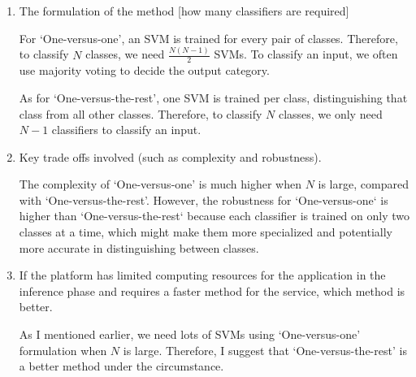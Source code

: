 \documentclass[twocolumn]{extarticle}
\begin{document}
\begin{enumerate}
	\begin{enumerate}[label=\alph*.]
	\item The formulation of the method [how many classifiers are required]
	
	For `One-versus-one', an SVM is trained for every pair of classes. Therefore, to classify $N$ classes, we need $\frac{N(N-1)}{2}$ SVMs. To classify an input, we often use majority voting to decide the output category. 
	
	As for `One-versus-the-rest', one SVM is trained per class, distinguishing that class from all other classes. Therefore, to classify $N$ classes, we only need $N-1$ classifiers to classify an input. 
	

	\item Key trade offs involved (such as complexity and robustness).
	
	The complexity of `One-versus-one' is much higher when $N$ is large, compared with `One-versus-the-rest'. However, the robustness for `One-versus-one` is higher than `One-versus-the-rest` because each classifier is trained on only two classes at a time, which might make them more specialized and potentially more accurate in distinguishing between classes.
	
	\item If the platform has limited computing resources for the application in the inference phase and requires a faster method for the service, which method is better.
	
	As I mentioned earlier, we need lots of SVMs using `One-versus-one' formulation when $N$ is large. Therefore, I suggest that `One-versus-the-rest' is a better method under the circumstance.
	\end{enumerate}

\end{enumerate}
\end{document}
